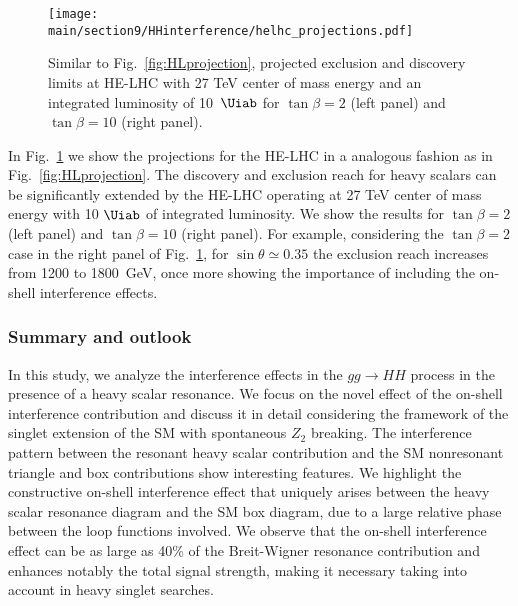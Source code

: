 \begin{figure}[t]
  \centering
\texttt{[image: \\main/section9/HHinterference/helhc\_projections.pdf]}
  \caption{
  Similar to Fig.~\ref{fig:HLprojection}, projected exclusion and discovery limits at HE-LHC with 27 TeV center of mass energy and an integrated luminosity of 10~$\Uiab$ for $\tan\beta=2$ (left panel) and $\tan\beta=10$ (right panel).
  }
  \label{fig:HEprojection}
\end{figure} 

In Fig.~\ref{fig:HEprojection} we show the projections for the HE-LHC in a analogous fashion as in Fig.~\ref{fig:HLprojection}. The discovery and exclusion reach for heavy scalars can be significantly extended by the HE-LHC operating at 27 TeV center of mass energy with 10 $\Uiab$ of integrated luminosity. We show the results for $\tan\beta=2$ (left panel) and $\tan\beta=10$ (right panel). 
For example, considering the $\tan\beta=2$ case in the right panel of Fig.~\ref{fig:HEprojection}, for $\sin\theta\simeq 0.35$ the exclusion reach increases from 1200 to 1800~GeV, once more showing the importance of including the on-shell interference effects.

\subsubsection*{Summary and outlook}
\label{sec:conclude}

In this study, we analyze the interference effects in the $gg\to HH$ process in the presence of a heavy scalar resonance.
We focus on the novel effect of the on-shell interference contribution and discuss it in detail considering the framework of the singlet extension of the SM with spontaneous $Z_2$ breaking. %
The interference pattern between the resonant heavy scalar contribution and the SM nonresonant triangle and box contributions show interesting features. 
We highlight the constructive on-shell interference effect that uniquely arises between the heavy scalar resonance diagram and the SM box diagram, due to a large relative phase between the loop functions involved.
We observe that the on-shell interference effect can be as large as 40\% of the Breit-Wigner resonance contribution and enhances notably the total signal strength, making it necessary taking into account in heavy singlet searches.

